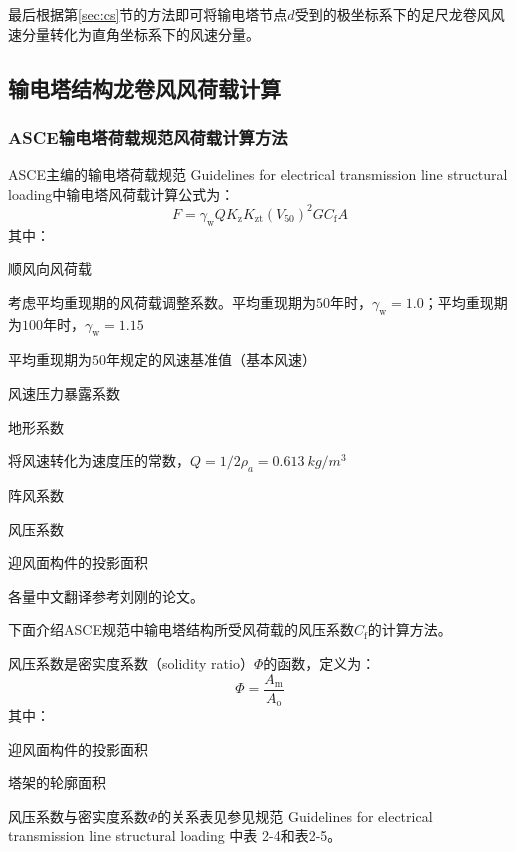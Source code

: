最后根据第\ref{sec:cs}节的方法即可将输电塔节点$d$受到的极坐标系下的足尺龙卷风风速分量转化为直角坐标系下的风速分量。


\subsection{输电塔结构龙卷风风荷载计算}
\subsubsection{ASCE输电塔荷载规范风荷载计算方法}
ASCE主编的输电塔荷载规范 Guidelines for electrical transmission line structural loading\cite{wong2009guidelines}中输电塔风荷载计算公式为：
\begin{equation}
	F = \gamma_{\mathrm{w}} Q K_{\mathrm{z}} K_{\mathrm{zt}} \left( V_{50}\right)^2 G C_{\mathrm{f}} A
\end{equation}
其中：
\begin{description}[leftmargin=!,labelwidth=2em]
	\item[$F$] 顺风向风荷载
	\item[$\gamma_{\mathrm{w}}$] 考虑平均重现期的风荷载调整系数。平均重现期为$50$年时，$\gamma_{\mathrm{w}}=1.0$；平均重现期为$100$年时，$\gamma_{\mathrm{w}}=1.15$
	\item[$V_{50}$] 平均重现期为$50$年规定的风速基准值（基本风速）
	\item[$K_{\mathrm{z}}$] 风速压力暴露系数
	\item[$K_{\mathrm{zt}}$] 地形系数
	\item[$Q$] 将风速转化为速度压的常数，$Q=1/2 \rho_a=\SI{0.613}{kg/m^3}$
	\item[$G$] 阵风系数
	\item[$C_{\mathrm{f}}$] 风压系数
	\item[$A$] 迎风面构件的投影面积
\end{description}
各量中文翻译参考刘刚的论文\cite{liu2010wind}。

下面介绍ASCE规范中输电塔结构所受风荷载的风压系数$C_{\mathrm{f}}$的计算方法。

风压系数是密实度系数（solidity ratio）$\Phi$的函数，定义为：
\begin{equation}
	\Phi = \frac{A_\mathrm{m}}{A_\mathrm{o}}
\end{equation}
其中：
\begin{description}[leftmargin=!,labelwidth=2em]
	\item[$A_\mathrm{m}$] 迎风面构件的投影面积
	\item[$A_\mathrm{o}$] 塔架的轮廓面积
\end{description}
风压系数与密实度系数$\Phi$的关系表见参见规范 Guidelines for electrical transmission line structural loading \cite{wong2009guidelines}中表 2-4和表2-5。

